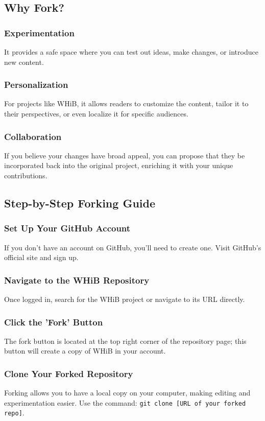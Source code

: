 \documentclass[a4paper,12pt]{book}
\begin{document}
\subsection*{Why Fork?}
\subsubsection*{Experimentation}
It provides a safe space where you can test out ideas, make changes, or introduce new content.

\subsubsection*{Personalization}
For projects like WHiB, it allows readers to customize the content, tailor it to their perspectives, or even localize it for specific audiences.

\subsubsection*{Collaboration}
If you believe your changes have broad appeal, you can propose that they be incorporated back into the original project, enriching it with your unique contributions.

\subsection*{Step-by-Step Forking Guide}
\subsubsection*{Set Up Your GitHub Account}
If you don't have an account on GitHub, you'll need to create one. Visit GitHub's official site and sign up.

\subsubsection*{Navigate to the WHiB Repository}
Once logged in, search for the WHiB project or navigate to its URL directly.

\subsubsection*{Click the 'Fork' Button}
The fork button is located at the top right corner of the repository page; this button will create a copy of WHiB in your account.

\subsubsection*{Clone Your Forked Repository}
Forking allows you to have a local copy on your computer, making editing and experimentation easier. Use the command: \texttt{git clone [URL of your forked repo]}.
\end{document}
